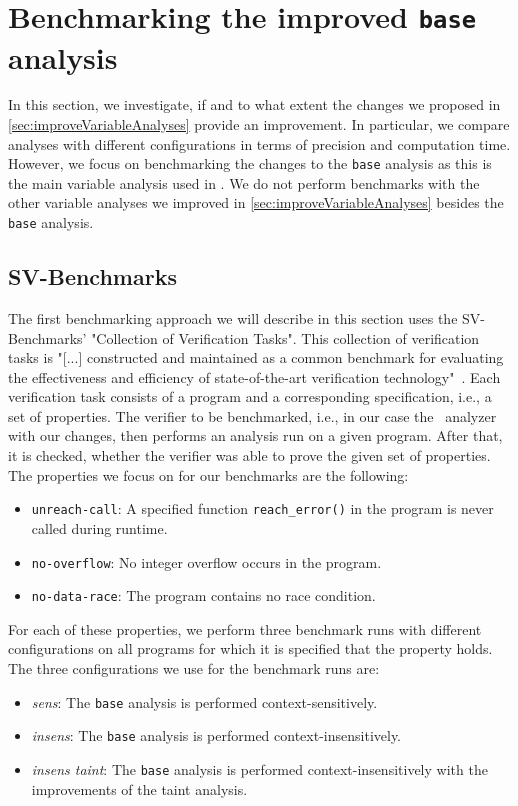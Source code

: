   \section{Benchmarking the improved \texttt{base} analysis}
    In this section, we investigate, if and to what extent the changes we proposed in \autoref{sec:improveVariableAnalyses} provide an improvement. In particular, we compare analyses with different configurations in terms of precision and computation time. However, we focus on benchmarking the changes to the \texttt{base} analysis as this is the main variable analysis used in \gob. We do not perform benchmarks with the other variable analyses we improved in \autoref{sec:improveVariableAnalyses} besides the \texttt{base} analysis.
    \subsection{SV-Benchmarks}\label{sec:benchSVbench}
      The first benchmarking approach we will describe in this section uses the SV-Benchmarks' "Collection of Verification Tasks". This collection of verification tasks is "[...] constructed and maintained as a common benchmark for evaluating the effectiveness and efficiency of state-of-the-art verification technology"~\parencite{svBench}. Each verification task consists of a program and a corresponding specification, i.e., a set of properties. The verifier to be benchmarked, i.e., in our case the \gob\ analyzer with our changes, then performs an analysis run on a given program. After that, it is checked, whether the verifier was able to prove the given set of properties. The properties we focus on for our benchmarks are the following:
      \begin{itemize}
        \item \texttt{unreach-call}: A specified function \texttt{reach\_error()} in the program is never called during runtime.
        \item \texttt{no-overflow}: No integer overflow occurs in the program.
        \item \texttt{no-data-race}: The program contains no race condition.
      \end{itemize}
      For each of these properties, we perform three benchmark runs with different configurations on all programs for which it is specified that the property holds.
      The three configurations we use for the benchmark runs are:
      \begin{itemize}
        \item \textit{sens}: The \texttt{base} analysis is performed context-sensitively.
        \item \textit{insens}: The \texttt{base} analysis is performed context-insensitively.
        \item \textit{insens taint}: The \texttt{base} analysis is performed context-insensitively with the improvements of the taint analysis.
      \end{itemize}
